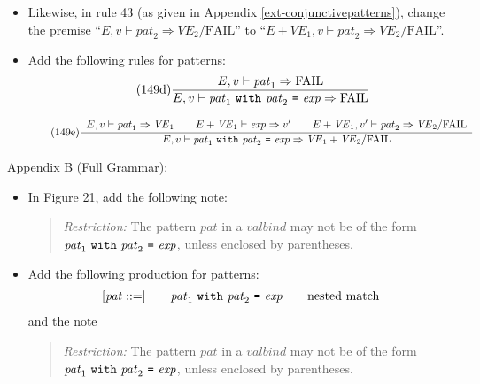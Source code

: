 \documentclass[twoside,titlepage]{article}
\begin{document}
\begin{appendix}
\begin{itemize}
\item Likewise, in rule 43 (as given in Appendix \ref{ext-conjunctivepatterns}), change the premise ``$E,v \vdash \mathit{pat}_2 \Rightarrow \mathit{VE}_2/\mbox{FAIL}$'' to ``$E+\mathit{VE}_1,v \vdash \mathit{pat}_2 \Rightarrow \mathit{VE}_2/\mbox{FAIL}$''.

\item Add the following rules for patterns:
  \begin{equation}
  \tag{149d}
  \frac{
  E,v \vdash \mathit{pat}_1 \Rightarrow \mbox{FAIL}
  }{
  E,v \vdash \mathit{pat}_1~{\tt{with}}~\mathit{pat}_2~\mbox{\tt=}~\mathit{exp} \Rightarrow \mbox{FAIL}
  }
  \end{equation}

  \begin{equation}
  \tag{149e}
  \frac{
  \begin{array}{c}
  E,v \vdash \mathit{pat}_1 \Rightarrow \mathit{VE}_1
  \qquad
  E+\mathit{VE}_1 \vdash \mathit{exp} \Rightarrow v'
  \qquad
  E+\mathit{VE}_1,v' \vdash \mathit{pat}_2 \Rightarrow \mathit{VE}_2/\mbox{FAIL}
  \end{array}
  }{
  E,v \vdash \mathit{pat}_1~{\tt{with}}~\mathit{pat}_2~\mbox{\tt=}~\mathit{exp} \Rightarrow \mathit{VE}_1+\mathit{VE}_2/\mbox{FAIL}
  }
  \end{equation}
\end{itemize}

Appendix B (Full Grammar):
\begin{itemize}
\item In Figure 21, add the following note:
  \begin{quote}
  {\it Restriction:} The pattern $\mathit{pat}$ in a $\mathit{valbind}$ may not be of the form $\mathit{pat}_1~{\tt{with}}~\mathit{pat}_2~\mbox{\tt=}~\mathit{exp}$, unless enclosed by parentheses.
  \end{quote}

\item Add the following production for patterns:
  $$
  \begin{array}{l@{\qquad}l@{\qquad}l}
   [\mathit{pat} ::=] & \mathit{pat}_1~{\tt{with}}~\mathit{pat}_2~\mbox{\tt=}~\mathit{exp} & \textrm{nested match}
  \end{array}
  $$
  and the note
  \begin{quote}
  {\it Restriction:} The pattern $\mathit{pat}$ in a $\mathit{valbind}$ may not be of the form $\mathit{pat}_1~{\tt{with}}~\mathit{pat}_2~\mbox{\tt=}~\mathit{exp}$, unless enclosed by parentheses.
  \end{quote}
\end{itemize}


\end{appendix}
\end{document}
